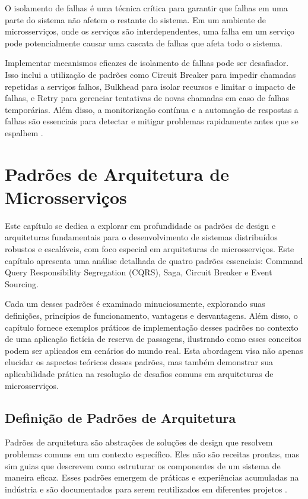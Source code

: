 O isolamento de falhas é uma técnica crítica para garantir que falhas em uma parte do sistema não afetem o restante do sistema. Em um ambiente de microsserviços, onde os serviços são interdependentes, uma falha em um serviço pode potencialmente causar uma cascata de falhas que afeta todo o sistema.

Implementar mecanismos eficazes de isolamento de falhas pode ser desafiador. Isso inclui a utilização de padrões como Circuit Breaker para impedir chamadas repetidas a serviços falhos, Bulkhead para isolar recursos e limitar o impacto de falhas, e Retry para gerenciar tentativas de novas chamadas em caso de falhas temporárias. Além disso, a monitorização contínua e a automação de respostas a falhas são essenciais para detectar e mitigar problemas rapidamente antes que se espalhem \cite{nygard2007}.

\chapter{Padrões de Arquitetura de Microsserviços}

Este capítulo se dedica a explorar em profundidade os padrões de design e arquiteturas fundamentais para o desenvolvimento de sistemas distribuídos robustos e escaláveis, com foco especial em arquiteturas de microsserviços. Este capítulo apresenta uma análise detalhada de quatro padrões essenciais: Command Query Responsibility Segregation (CQRS), Saga, Circuit Breaker e Event Sourcing.

Cada um desses padrões é examinado minuciosamente, explorando suas definições, princípios de funcionamento, vantagens e desvantagens. Além disso, o capítulo fornece exemplos práticos de implementação desses padrões no contexto de uma aplicação fictícia de reserva de passagens, ilustrando como esses conceitos podem ser aplicados em cenários do mundo real. Esta abordagem visa não apenas elucidar os aspectos teóricos desses padrões, mas também demonstrar sua aplicabilidade prática na resolução de desafios comuns em arquiteturas de microsserviços.

\section{Definição de Padrões de Arquitetura}

Padrões de arquitetura são abstrações de soluções de design que resolvem problemas comuns em um contexto específico. Eles não são receitas prontas, mas sim guias que descrevem como estruturar os componentes de um sistema de maneira eficaz. Esses padrões emergem de práticas e experiências acumuladas na indústria e são documentados para serem reutilizados em diferentes projetos \cite{buschmann1996}.

